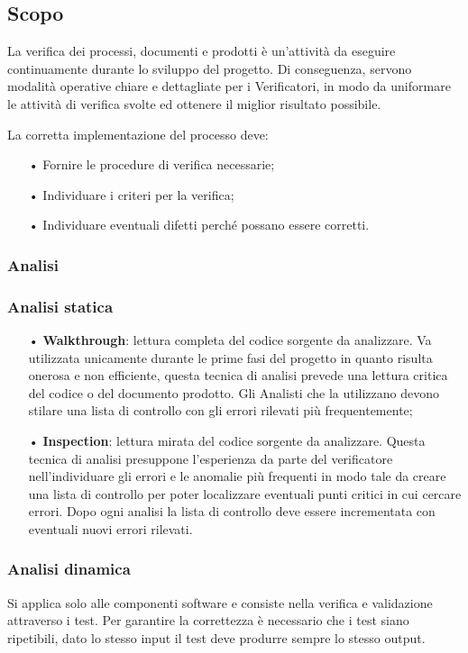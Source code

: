 \subsection{Scopo}

La verifica dei processi, documenti e prodotti è un’attività da eseguire continuamente durante lo sviluppo del progetto. Di conseguenza, servono modalità operative chiare e dettagliate per i Verificatori, in modo da uniformare le attività di verifica svolte ed ottenere il miglior risultato possibile. 

La corretta implementazione del processo deve:
\begin{itemize}
\item[•] Fornire le procedure di verifica necessarie; 
\item[•] Individuare i criteri per la verifica; 
\item[•] Individuare eventuali difetti perché possano essere corretti.
\end{itemize}

\subsubsection{Analisi}

\subsubsection{Analisi statica}
\begin{itemize}
\item[•] \textbf{Walkthrough}: lettura completa del codice sorgente da analizzare. Va utilizzata unicamente durante le prime fasi del progetto in quanto risulta onerosa e non efficiente, questa tecnica di analisi prevede una lettura critica del codice o del documento prodotto. Gli Analisti che la utilizzano devono stilare una lista di controllo con gli errori rilevati più frequentemente;
\item[•] \textbf{Inspection}: lettura mirata del codice sorgente da analizzare. Questa tecnica di analisi presuppone l’esperienza da parte del verificatore nell’individuare gli errori e le anomalie più frequenti in modo tale da creare una lista di controllo per poter localizzare eventuali punti critici in cui cercare errori. Dopo ogni analisi la lista di controllo deve essere incrementata con eventuali nuovi errori rilevati.
\end{itemize}

\subsubsection{Analisi dinamica}
Si applica solo alle componenti software e consiste nella verifica e validazione attraverso i test. Per garantire la correttezza è necessario che i test siano ripetibili, dato lo stesso input il test deve produrre sempre lo stesso output.  

